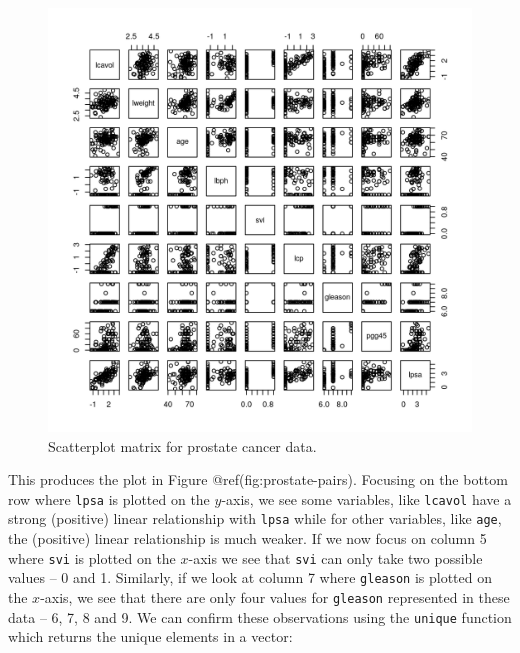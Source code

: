 \documentclass[
]{article}
\newenvironment{Shaded}{\begin{snugshade}}{\end{snugshade}}
\newcommand{\DocumentationTok}[1]{\textcolor[rgb]{0.56,0.35,0.01}{\textbf{\textit{#1}}}}
\newcommand{\FunctionTok}[1]{\textcolor[rgb]{0.13,0.29,0.53}{\textbf{#1}}}
\newcommand{\NormalTok}[1]{#1}
\newcommand{\SpecialCharTok}[1]{\textcolor[rgb]{0.81,0.36,0.00}{\textbf{#1}}}
\begin{document}
\begin{figure}[th]

{\centering \includegraphics{prostate-pairs-1} 

}

\caption{Scatterplot matrix for prostate cancer data.}\label{fig:prostate-pairs}
\end{figure}

This produces the plot in Figure @ref(fig:prostate-pairs). Focusing on
the bottom row where \texttt{lpsa} is plotted on the \(y\)-axis, we see
some variables, like \texttt{lcavol} have a strong (positive) linear
relationship with \texttt{lpsa} while for other variables, like
\texttt{age}, the (positive) linear relationship is much weaker. If we
now focus on column 5 where \texttt{svi} is plotted on the \(x\)-axis we
see that \texttt{svi} can only take two possible values -- 0 and 1.
Similarly, if we look at column 7 where \texttt{gleason} is plotted on
the \(x\)-axis, we see that there are only four values for
\texttt{gleason} represented in these data -- 6, 7, 8 and 9. We can
confirm these observations using the \texttt{unique} function which
returns the unique elements in a vector:

\begin{Shaded}
\end{Shaded}
\end{document}
